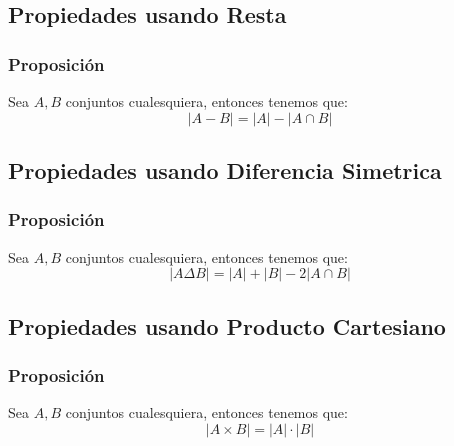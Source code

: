 \documentclass[12pt]{report}                                    %
\begin{document}
            \clearpage
            \subsection{Propiedades usando Resta}

                \subsubsection{Proposición}
                    Sea $A, B$ conjuntos cualesquiera, entonces tenemos que:
                    \begin{equation*}
                        |A - B| = |A| - |A \cap B|
                    \end{equation*}


            \subsection{Propiedades usando Diferencia Simetrica}

                \subsubsection{Proposición}
                    Sea $A, B$ conjuntos cualesquiera, entonces tenemos que:
                    \begin{equation*}
                        |A \Delta B| = |A| + |B| - 2|A \cap B|
                    \end{equation*}

            \clearpage
            \subsection{Propiedades usando Producto Cartesiano}

                \subsubsection{Proposición}
                    Sea $A, B$ conjuntos cualesquiera, entonces tenemos que:
                    \begin{equation*}
                        |A \times B| = |A| \cdot |B|
                    \end{equation*}
\end{document}
